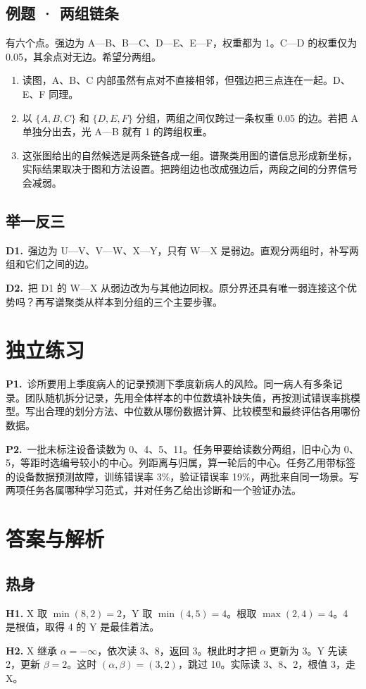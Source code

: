 \documentclass[UTF8,a4paper,11pt]{ctexart}
\newcommand{\PracticeQuestion}[3]{\par\Needspace{4\baselineskip}\noindent\begin{minipage}{\linewidth}\textbf{#1.}\ #2\par\noindent\rule{0pt}{#3mm}\par\end{minipage}\par}
\begin{document}
\subsection{例题 · 两组链条}
有六个点。强边为 A—B、B—C、D—E、E—F，权重都为 1。C—D 的权重仅为 0.05，其余点对无边。希望分两组。

\begin{enumerate}
\item 读图，A、B、C 内部虽然有点对不直接相邻，但强边把三点连在一起。D、E、F 同理。
\item 以 $\{A,B,C\}$ 和 $\{D,E,F\}$ 分组，两组之间仅跨过一条权重 0.05 的边。若把 A 单独分出去，光 A—B 就有 1 的跨组权重。
\item 这张图给出的自然候选是两条链各成一组。谱聚类用图的谱信息形成新坐标，实际结果取决于图和方法设置。把跨组边也改成强边后，两段之间的分界信号会减弱。
\end{enumerate}
\subsection{举一反三}
\PracticeQuestion{D1}{强边为 U—V、V—W、X—Y，只有 W—X 是弱边。直观分两组时，补写两组和它们之间的边。}{32}
\PracticeQuestion{D2}{把 D1 的 W—X 从弱边改为与其他边同权。原分界还具有唯一弱连接这个优势吗？再写谱聚类从样本到分组的三个主要步骤。}{32}
\clearpage
\section{独立练习}
\PracticeQuestion{P1}{诊所要用上季度病人的记录预测下季度新病人的风险。同一病人有多条记录。团队随机拆分记录，先用全体样本的中位数填补缺失值，再按测试错误率挑模型。写出合理的划分方法、中位数从哪份数据计算、比较模型和最终评估各用哪份数据。}{58}
\PracticeQuestion{P2}{一批未标注设备读数为 0、4、5、11。任务甲要给读数分两组，旧中心为 0、5，等距时选编号较小的中心。列距离与归属，算一轮后的中心。任务乙用带标签的设备数据预测故障，训练错误率 3\%，验证错误率 19\%，两批来自同一场景。写两项任务各属哪种学习范式，并对任务乙给出诊断和一个验证办法。}{58}
\clearpage
\section{答案与解析}
\subsection{热身}
\textbf{H1.} X 取 $\min(8,2)=2$，Y 取 $\min(4,5)=4$。根取 $\max(2,4)=4$。4 是根值，取得 4 的 Y 是最佳着法。

\textbf{H2.} X 继承 $\alpha=-\infty$，依次读 3、8，返回 3。根此时才把 $\alpha$ 更新为 3。Y 先读 2，更新 $\beta=2$。这时 $(\alpha,\beta)=(3,2)$，跳过 10。实际读 3、8、2，根值 3，走 X。
\end{document}
